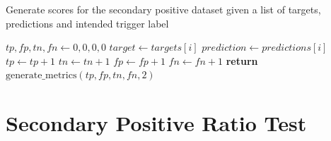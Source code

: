 \begin{algorithm}[H]
    \caption{Generate scores for the secondary positive dataset given a list of targets, predictions and intended trigger label}
    \begin{algorithmic}[1]
        \State $tp, fp, tn, fn \gets 0, 0, 0, 0$
        \State
        \State $target \gets targets[i]$
        \State $prediction \gets predictions[i]$
        \State $tp \gets tp + 1$
        \State $tn \gets tn + 1$
        \State $fp \gets fp + 1$
        \State $fn \gets fn + 1$
        \EndIf
        \EndFor
        \State \textbf{return} $\text{generate\_metrics}(tp, fp, tn, fn, 2)$ 
        \EndFunction
    \end{algorithmic}
    \label{alg:positive_scores}
\end{algorithm}

\chapter{Secondary Positive Ratio Test}
\label{app:ratio_test}

